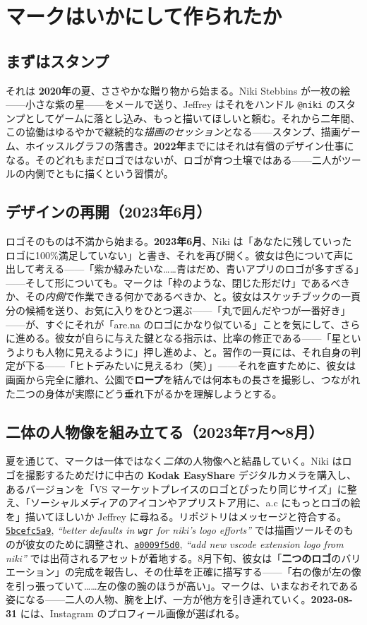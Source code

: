 \documentclass[10pt,letterpaper,twocolumn]{article}
\newcommand{\commit}[2]{\href{https://github.com/whistlegraph/aesthetic-computer/commit/#1}{\texttt{#1}}, \emph{``#2''}}
\begin{document}
\section{マークはいかにして作られたか}

\subsection{まずはスタンプ}
それは \textbf{2020年}の夏、ささやかな贈り物から始まる。Niki Stebbins が一枚の絵——小さな紫の星——をメールで送り、Jeffrey はそれをハンドル \texttt{@niki} のスタンプとしてゲームに落とし込み、もっと描いてほしいと頼む。それから二年間、この協働はゆるやかで継続的な\emph{描画のセッション}となる——スタンプ、描画ゲーム、ホイッスルグラフの落書き。\textbf{2022年}までにはそれは有償のデザイン仕事になる。そのどれもまだロゴではないが、ロゴが育つ土壌ではある——二人がツールの内側でともに描くという習慣が。

\subsection{デザインの再開（2023年6月）}
ロゴそのものは不満から始まる。\textbf{2023年6月}、Niki は「あなたに残していったロゴに100\%満足していない」と書き、それを再び開く。彼女は色について声に出して考える——「紫か緑みたいな……青はだめ、青いアプリのロゴが多すぎる」——そして形についても。マークは「枠のような、閉じた形だけ」であるべきか、その\emph{内側}で作業できる何かであるべきか、と。彼女はスケッチブックの一頁分の候補を送り、お気に入りをひとつ選ぶ——「丸で囲んだやつが一番好き」——が、すぐにそれが「are.na のロゴにかなり似ている」ことを気にして、さらに進める。彼女が自らに与えた鍵となる指示は、比率の修正である——「星というよりも人物に見えるように」押し進めよ、と。習作の一頁には、それ自身の判定が下る——「ヒトデみたいに見えるわ（笑）」——それを直すために、彼女は画面から完全に離れ、公園で\textbf{ロープ}を結んでは何本もの長さを撮影し、つながれた二つの身体が実際にどう垂れ下がるかを理解しようとする。

\subsection{二体の人物像を組み立てる（2023年7月〜8月）}
夏を通じて、マークは一体ではなく\emph{二体}の人物像へと結晶していく。Niki はロゴを撮影するためだけに中古の \textbf{Kodak EasyShare} デジタルカメラを購入し、あるバージョンを「VS マーケットプレイスのロゴとぴったり同じサイズ」に整え、「ソーシャルメディアのアイコンやアプリストア用に、a.c にもっとロゴの絵を」描いてほしいか Jeffrey に尋ねる。リポジトリはメッセージと符合する。\commit{5bcefc5a9}{better defaults in \texttt{wgr} for niki's logo efforts} では描画ツールそのものが彼女のために調整され、\commit{a0009f5d0}{add new vscode extension logo from niki} では出荷されるアセットが着地する。8月下旬、彼女は「\textbf{二つのロゴ}のバリエーション」の完成を報告し、その仕草を正確に描写する——「右の像が左の像を引っ張っていて……左の像の腕のほうが高い」。マークは、いまなおそれである姿になる——二人の人物、腕を上げ、一方が他方を引き連れていく。\textbf{2023-08-31} には、Instagram のプロフィール画像が選ばれる。
\end{document}
